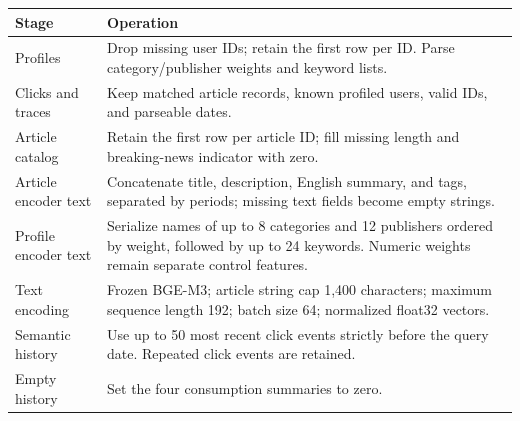 
\begingroup
\makeatletter{}\makeatother
\centering
\caption{Implemented preprocessing and semantic inputs. Limits describe the recorded implementation, not additional tuning on the test set.}
\label{tab:preprocessing_detail}
\small
\setlength{\tabcolsep}{5pt}
\renewcommand{\arraystretch}{1.16}
\begin{tabular}{p{}p{}}
\toprule
Stage & Operation \\
\midrule
Profiles & Drop missing user IDs; retain the first row per ID. Parse category/publisher weights and keyword lists. \\
Clicks and traces & Keep matched article records, known profiled users, valid IDs, and parseable dates. \\
Article catalog & Retain the first row per article ID; fill missing length and breaking-news indicator with zero. \\
Article encoder text & Concatenate title, description, English summary, and tags, separated by periods; missing text fields become empty strings. \\
Profile encoder text & Serialize names of up to 8 categories and 12 publishers ordered by weight, followed by up to 24 keywords. Numeric weights remain separate control features. \\
Text encoding & Frozen BGE-M3; article string cap 1,400 characters; maximum sequence length 192; batch size 64; normalized float32 vectors. \\
Semantic history & Use up to 50 most recent click events strictly before the query date. Repeated click events are retained. \\
Empty history & Set the four consumption summaries to zero. \\
\bottomrule
\end{tabular}
\endgroup

